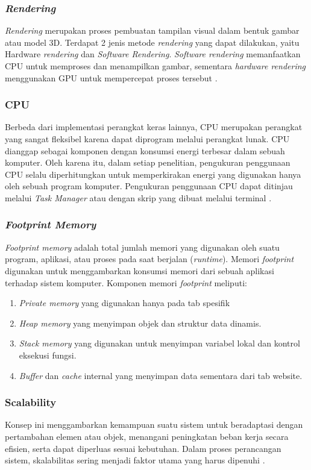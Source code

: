 \subsubsection{\textit{Rendering}}
\textit{Rendering} merupakan proses pembuatan tampilan visual dalam bentuk gambar atau model 3D. Terdapat 2 jenis metode \textit{rendering} yang dapat dilakukan, yaitu Hardware \textit{rendering} dan \textit{Software Rendering}. \textit{Software rendering} memanfaatkan CPU untuk memproses dan menampilkan gambar, sementara \textit{hardware rendering} menggunakan GPU untuk mempercepat proses tersebut \cite{Paradis2016}.

\subsubsection{CPU}
Berbeda dari implementasi perangkat keras lainnya, CPU merupakan perangkat yang sangat fleksibel karena dapat diprogram melalui perangkat lunak. CPU dianggap sebagai komponen dengan konsumsi energi terbesar dalam sebuah komputer. Oleh karena itu, dalam setiap penelitian, pengukuran penggunaan CPU selalu diperhitungkan untuk memperkirakan energi yang digunakan hanya oleh sebuah program komputer. Pengukuran penggunaan CPU dapat ditinjau melalui \textit{Task Manager} atau dengan skrip yang dibuat melalui terminal \cite{8566475}.

\subsubsection{\textit{Footprint Memory}}
\textit{Footprint memory} adalah total jumlah memori yang digunakan oleh suatu program, aplikasi, atau proses pada saat berjalan (\textit{runtime}). Memori \textit{footprint} digunakan untuk menggambarkan konsumsi memori dari sebuah aplikasi terhadap sistem komputer. Komponen memori \textit{footprint} meliputi:
\begin{enumerate}
	\item \textit{Private memory} yang digunakan hanya pada tab spesifik 
	\item \textit{Heap memory} yang menyimpan objek dan struktur data dinamis.
	\item \textit{Stack memory} yang digunakan untuk menyimpan variabel lokal dan kontrol eksekusi fungsi.
	\item \textit{Buffer} dan \textit{cache} internal yang menyimpan data sementara dari tab website.
\end{enumerate}

\subsubsection{Scalability}
Konsep ini menggambarkan kemampuan suatu sistem untuk beradaptasi dengan pertambahan elemen atau objek, menangani peningkatan beban kerja secara efisien, serta dapat diperluas sesuai kebutuhan. Dalam proses perancangan sistem, skalabilitas sering menjadi faktor utama yang harus dipenuhi \cite{Bondi2000}.

